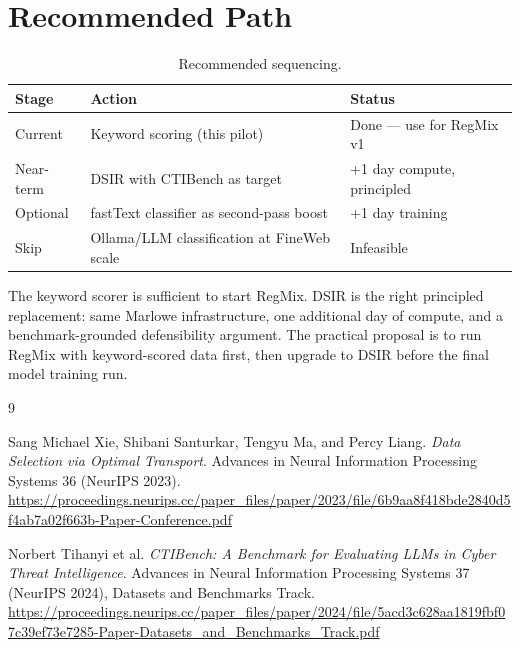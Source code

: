 \documentclass[11pt]{article}
\begin{document}
\section{Recommended Path}

\begin{table}[h]
\centering
\begin{tabular}{lll}
\toprule
\textbf{Stage} & \textbf{Action} & \textbf{Status} \\
\midrule
Current     & Keyword scoring (this pilot)            & Done --- use for RegMix v1 \\
Near-term   & DSIR with CTIBench as target            & +1 day compute, principled \\
Optional    & fastText classifier as second-pass boost & +1 day training \\
Skip        & Ollama/LLM classification at FineWeb scale & Infeasible \\
\bottomrule
\end{tabular}
\caption{Recommended sequencing.}
\end{table}

The keyword scorer is sufficient to start RegMix. DSIR is the right principled
replacement: same Marlowe infrastructure, one additional day of compute, and a
benchmark-grounded defensibility argument. The practical proposal is to run RegMix
with keyword-scored data first, then upgrade to DSIR before the final model training run.

\begin{thebibliography}{9}

Sang Michael Xie, Shibani Santurkar, Tengyu Ma, and Percy Liang.
\textit{Data Selection via Optimal Transport}.
Advances in Neural Information Processing Systems 36 (NeurIPS 2023).
\url{https://proceedings.neurips.cc/paper_files/paper/2023/file/6b9aa8f418bde2840d5f4ab7a02f663b-Paper-Conference.pdf}

Norbert Tihanyi et al.
\textit{CTIBench: A Benchmark for Evaluating LLMs in Cyber Threat Intelligence}.
Advances in Neural Information Processing Systems 37 (NeurIPS 2024), Datasets and Benchmarks Track.
\url{https://proceedings.neurips.cc/paper_files/paper/2024/file/5acd3c628aa1819fbf07c39ef73e7285-Paper-Datasets_and_Benchmarks_Track.pdf}

\end{thebibliography}
\end{document}
